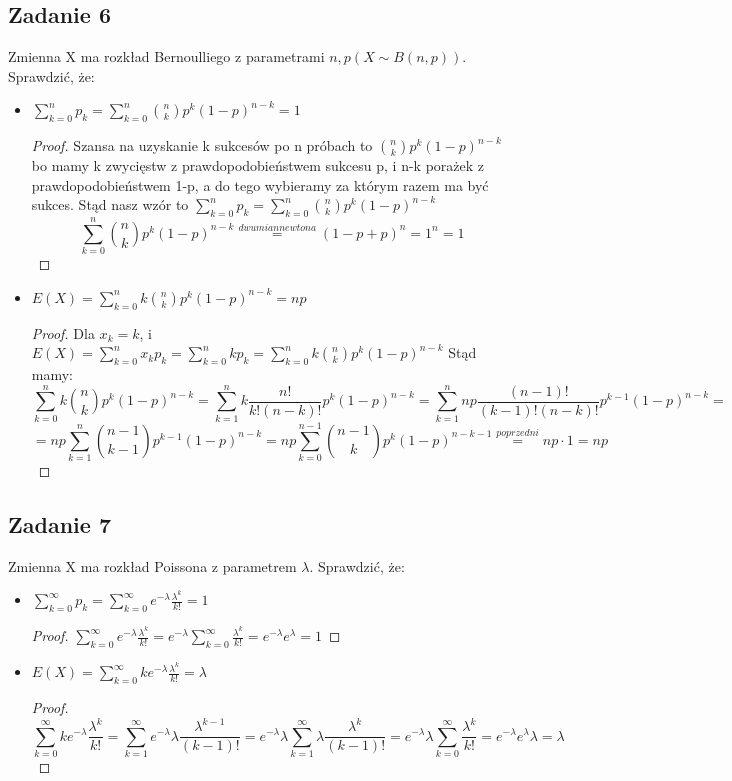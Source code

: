 \documentclass[a4paper]{article}
\begin{document}
\subsection*{Zadanie 6}
Zmienna X ma rozkład Bernoulliego z parametrami $n, p (X \sim B(n, p))$. Sprawdzić, że: 
\begin{itemize}
\item $\sum\limits_{k=0}^n p_k = \sum\limits_{k=0}^n {n \choose k} p^k (1-p)^{n-k} = 1 $
\begin{proof}
Szansa na uzyskanie k sukcesów po n próbach to ${n \choose k} p^k (1-p)^{n-k}$ bo mamy k zwycięstw z prawdopodobieństwem sukcesu p, i n-k porażek z prawdopodobieństwem 1-p, a do tego wybieramy za którym razem ma być sukces. Stąd nasz wzór to $\sum\limits_{k=0}^n p_k = \sum\limits_{k=0}^n {n \choose k} p^k (1-p)^{n-k}$
$$\sum\limits_{k=0}^n {n \choose k} p^k (1-p)^{n-k} \stackrel{dwumian newtona}{=} (1-p+p)^n = 1^n =1  $$
\end{proof}
\item $E(X)=\sum\limits_{k=0}^n k {n \choose k} p^k (1-p)^{n-k}=np$
\begin{proof}
Dla $x_k=k$, i $E(X)=\sum\limits_{k=0}^n x_k p_k = \sum\limits_{k=0}^n k p_k = \sum\limits_{k=0}^n k {n \choose k} p^k (1-p)^{n-k}$ Stąd mamy:
$$\sum\limits_{k=0}^n k {n \choose k} p^k (1-p)^{n-k} = \sum\limits_{k=1}^n k \frac{n!}{k!(n-k)!} p^k (1-p)^{n-k} = \sum\limits_{k=1}^n np \frac{(n-1)!}{(k-1)!(n-k)!} p^{k-1} (1-p)^{n-k} =$$ $$=np \sum\limits_{k=1}^n {n-1 \choose k-1} p^{k-1} (1-p)^{n-k} = np \sum\limits_{k=0}^{n-1} {n-1 \choose k} p^{k} (1-p)^{n-k-1} \stackrel{poprzedni}{=} np \cdot 1 = np$$ 
\end{proof}
\end{itemize}

\subsection*{Zadanie 7}
Zmienna X ma rozkład Poissona z parametrem $\lambda$. Sprawdzić, że:
\begin{itemize}
\item $\sum\limits_{k=0}^\infty p_k = \sum\limits_{k=0}^\infty e^{-\lambda} \frac{\lambda^k}{k!} = 1$
\begin{proof}
$\sum\limits_{k=0}^\infty e^{-\lambda} \frac{\lambda^k}{k!} =  e^{-\lambda} \sum\limits_{k=0}^\infty \frac{\lambda^k}{k!} = e^{-\lambda} e^\lambda=1$
\end{proof}
\item $E(X)=\sum\limits_{k=0}^\infty k e^{-\lambda} \frac{\lambda^k}{k!} = \lambda$ 
\begin{proof}

$$\sum\limits_{k=0}^\infty k e^{-\lambda} \frac{\lambda^k}{k!} = \sum\limits_{k=1}^\infty e^{-\lambda} \lambda \frac{\lambda^{k-1}}{(k-1)!} = e^{-\lambda} \lambda \sum\limits_{k=1}^\infty \lambda \frac{\lambda^k}{(k-1)!} = e^{-\lambda} \lambda \sum\limits_{k=0}^\infty \frac{\lambda^{k}}{k!}=e^{-\lambda} e^\lambda \lambda = \lambda$$
\end{proof}
\end{itemize}
\end{document}
